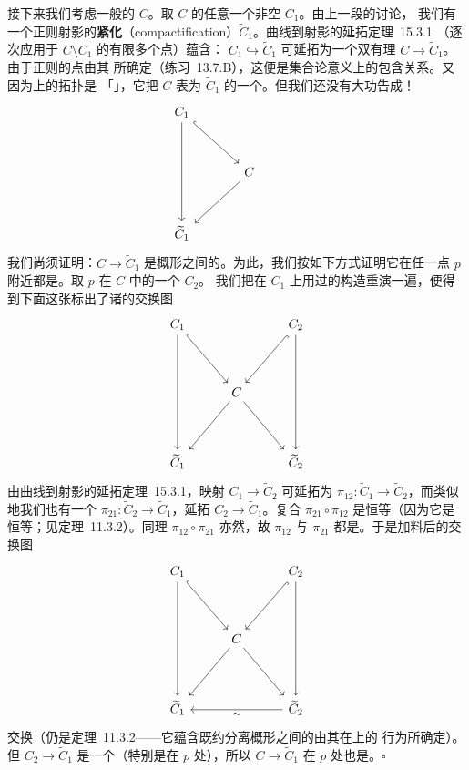 接下来我们考虑一般的 $C$。取 $C$ 的任意一个非空\trAffine\trOpenSubset{} $C_1$。由上一段的讨论，
我们有一个正则射影的\textbf{紧化}（compactification）$\widetilde{C}_1$。\mbox{曲线到射影的延拓定理~15.3.1}
（逐次应用于 $C\setminus C_1$ 的有限多个点）蕴含：\trMorphism{} $C_1\hookrightarrow\widetilde{C}_1$
可延拓为一个双有理\trMorphism{} $C\to\widetilde{C}_1$。由于\trSeparated{}正则\trCurve{}的点由其%
\trValuation{}所确定（\mbox{练习~13.7.B}），这便是集合论意义上的包含关系。又因为\trCurve{}上的拓扑是
「\trCofiniteTopology」，它把 $C$ 表为 $\widetilde{C}_1$ 的一个\trOpenSubset。但我们还没有大功告成！
\[
\begin{tikzcd}[column sep=3.5em, row sep=3.2em]
C_1 \ar[dr, hook] \ar[dd] & & \\
& C \ar[dl] & \\
\widetilde{C}_1 & &
\end{tikzcd}
\]
我们尚须证明：$C\to\widetilde{C}_1$ 是概形之间的\emph{\trOpenEmbedding}。为此，我们按如下方式证明它在任一点
$p$ 附近都是\trOpenEmbedding。取 $p$ 在 $C$ 中的一个\trAffine\trOpen\trNeighborhood{} $C_2$。
我们把在 $C_1$ 上用过的构造重演一遍，便得到下面这张标出了诸\trOpenEmbedding{}的交换图
\[
\begin{tikzcd}[column sep=2.8em, row sep=3.8em]
C_1 \ar[dr, hook] \ar[dd] & & C_2 \ar[dl, hook] \ar[dd] \\
& C \ar[dl] \ar[dr] & \\
\widetilde{C}_1 & & \widetilde{C}_2
\end{tikzcd}
\]
由\mbox{曲线到射影的延拓定理~15.3.1}，映射 $C_1\to\widetilde{C}_2$ 可延拓为
$\pi_{12}\colon\widetilde{C}_1\to\widetilde{C}_2$，而类似地我们也有一个\trMorphism{}
$\pi_{21}\colon\widetilde{C}_2\to\widetilde{C}_1$，延拓 $C_2\to\widetilde{C}_1$。复合
$\pi_{21}\circ\pi_{12}$ 是恒等\trMorphism（因为它是恒等\trRationalMap；见\mbox{定理~11.3.2}）。同理
$\pi_{12}\circ\pi_{21}$ 亦然，故 $\pi_{12}$ 与 $\pi_{21}$ 都是\trIsomorphism。于是加料后的交换图
\[
\begin{tikzcd}[column sep=2.8em, row sep=3.8em]
C_1 \ar[dr, hook] \ar[dd] & & C_2 \ar[dl, hook] \ar[dd] \\
& C \ar[dl] \ar[dr] & \\
\widetilde{C}_1 & & \widetilde{C}_2
\ar[ll, "\sim"]
\end{tikzcd}
\]
交换（仍是\mbox{定理~11.3.2}——它蕴含既约分离概形之间的\trMorphism{}由其在\trDense\trOpenSet{}上的
行为所确定）。但 $C_2\to\widetilde{C}_1$ 是一个\trOpenEmbedding（特别是在 $p$ 处），所以
$C\to\widetilde{C}_1$ 在 $p$ 处也是\trOpenEmbedding。\hfill$\square$

